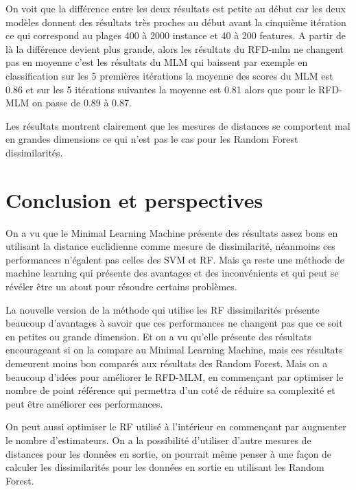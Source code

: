 \documentclass[12pt,a4paper]{report}
\begin{document}
\par On voit que la différence entre les deux résultats est petite au début car les deux modèles donnent des résultats très proches au début avant la cinquième itération ce qui correspond au plages 400 à 2000 instance et 40 à 200 features. A partir de là la différence devient plus grande, alors les résultats du RFD-mlm ne changent pas en moyenne c'est les résultats du MLM qui baissent par exemple en classification sur les 5 premières itérations la moyenne des scores du MLM est 0.86 et sur les 5 itérations suivantes la moyenne est 0.81 alors que pour le RFD-MLM on passe de 0.89 à 0.87.

\par Les résultats montrent clairement que les mesures de distances se comportent mal en grandes dimensions ce qui n'est pas le cas pour les Random Forest dissimilarités.
{\color{MidnightBlue}\chapter{Conclusion et perspectives}}
\par On a vu que le Minimal Learning Machine présente des résultats assez bons en utilisant la distance euclidienne comme mesure de dissimilarité, néanmoins ces performances n'égalent pas celles des SVM et RF. Mais ça reste une méthode de machine learning qui présente des avantages et des inconvénients et qui peut se révéler être un atout pour résoudre certains problèmes. 
\par La nouvelle version de la méthode qui utilise les RF dissimilarités présente beaucoup d'avantages à savoir que ces performances ne changent pas que ce soit en petites ou grande dimension. Et on a vu qu'elle présente des résultats encourageant si on la compare au Minimal Learning Machine, mais ces résultats demeurent moins bon comparés aux résultats des Random Forest. Mais on a beaucoup d'idées pour améliorer le RFD-MLM, en commençant par optimiser le nombre de point référence qui permettra d'un coté de réduire sa complexité et peut être améliorer ces performances.

\par On peut aussi optimiser le RF utilisé à  l'intérieur en commençant par augmenter le nombre d'estimateurs. On a la possibilité d'utiliser d'autre mesures de distances pour les données en sortie, on pourrait même penser à une façon de calculer les dissimilarités pour les données en sortie en utilisant les Random Forest.
\end{document}
